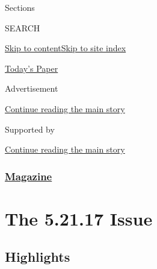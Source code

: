 Sections

SEARCH

\protect\hyperlink{site-content}{Skip to
content}\protect\hyperlink{site-index}{Skip to site index}

\href{https://myaccount.nytimes3xbfgragh.onion/auth/login?response_type=cookie\&client_id=vi}{}

\href{https://www.nytimes3xbfgragh.onion/section/todayspaper}{Today's
Paper}

Advertisement

\protect\hyperlink{after-top}{Continue reading the main story}

Supported by

\protect\hyperlink{after-sponsor}{Continue reading the main story}

\hypertarget{magazine}{%
\subsubsection{\texorpdfstring{\href{/section/magazine}{Magazine}}{Magazine}}\label{magazine}}

\hypertarget{the-52117-issue}{%
\section{The 5.21.17 Issue}\label{the-52117-issue}}

\hypertarget{highlights}{%
\subsection{Highlights}\label{highlights}}

